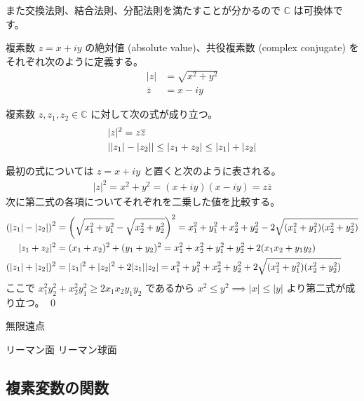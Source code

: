 \documentclass[uplatex,dvipdfmx,a4paper,11pt]{jlreq}
\makeatletter
\newcommand{\CC}{\mathbb{C}}
\theoremstyle{definition}
\renewenvironment{proof}[1][\proofname]{\par
  \normalfont
  \topsep6\p@\@plus6\p@ \trivlist
  \item[\hskip\labelsep{\bfseries #1}\@addpunct{\bfseries}]\ignorespaces\quad\par
}{%
  \qed\endtrivlist\@endpefalse
}
\renewcommand\proofname{証明}
\makeatother
\begin{document}
また交換法則、結合法則、分配法則を満たすことが分かるので $\CC$ は可換体です。
\begin{definition}
  複素数 $z = x + iy$ の絶対値 (absolute value)、共役複素数 (complex conjugate) をそれぞれ次のように定義する。
  \begin{align}
    |z|          & = \sqrt{x^2 + y^2} \\
    \overline{z} & = x - iy
  \end{align}
\end{definition}
\begin{proposition}
  複素数 $z, z_1, z_2\in\CC$ に対して次の式が成り立つ。
  \begin{align}
     & |z|^2 = z\overline{z}                                   \\
     & \qty||z_1| - |z_2|| \leq |z_1 + z_2| \leq |z_1| + |z_2|
  \end{align}
\end{proposition}
\begin{proof}
  最初の式については $z = x + iy$ と置くと次のように表される。
  \begin{align}
    |z|^2 = x^2 + y^2 = (x + iy)(x - iy) = z\overline{z}
  \end{align}
  次に第二式の各項についてそれぞれを二乗した値を比較する。
  \begin{align}
    \qty(|z_1| - |z_2|)^2 & = \qty(\sqrt{x_1^2 + y_1^2} - \sqrt{x_2^2 + y_2^2})^2 = x_1^2 + y_1^2 + x_2^2 + y_2^2 - 2\sqrt{(x_1^2 + y_1^2)(x_2^2 + y_2^2)} \\
    |z_1 + z_2|^2         & = (x_1 + x_2)^2 + (y_1 + y_2)^2 = x_1^2 + x_2^2 + y_1^2 + y_2^2 + 2(x_1x_2 + y_1y_2)                                           \\
    (|z_1| + |z_2|)^2     & = |z_1|^2 + |z_2|^2 + 2|z_1||z_2| = x_1^2 + y_1^2 + x_2^2 + y_2^2 + 2\sqrt{(x_1^2 + y_1^2)(x_2^2 + y_2^2)}
  \end{align}
  ここで $x_1^2y_2^2 + x_2^2y_1^2 \geq 2x_1x_2y_1y_2$ であるから $x^2 \leq y^2\implies |x|\leq |y|$ より第二式が成り立つ。
\end{proof}

無限遠点

リーマン面
リーマン球面

\subsection{複素変数の関数}
\end{document}
